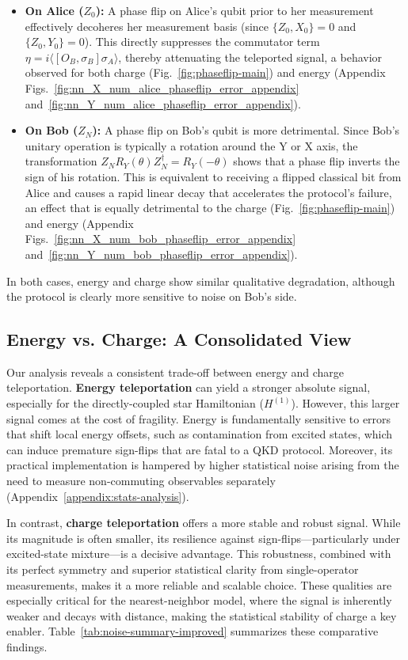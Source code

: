 \begin{itemize}
    \item \textbf{On Alice ($Z_0$):} A phase flip on Alice's qubit prior to her measurement effectively decoheres her measurement basis (since $\{Z_0, X_0\}=0$ and $\{Z_0, Y_0\}=0$). This directly suppresses the commutator term $\eta=i\langle[O_B, \sigma_B]\sigma_A\rangle$, thereby attenuating the teleported signal, a behavior observed for both charge (Fig.~\ref{fig:phaseflip-main}) and energy (Appendix Figs.~\ref{fig:nn_X_num_alice_phaseflip_error_appendix} and~\ref{fig:nn_Y_num_alice_phaseflip_error_appendix}).
    \item \textbf{On Bob ($Z_N$):} A phase flip on Bob's qubit is more detrimental. Since Bob's unitary operation is typically a rotation around the Y or X axis, the transformation $Z_N R_Y(\theta) Z_N^\dagger = R_Y(-\theta)$ shows that a phase flip inverts the sign of his rotation. This is equivalent to receiving a flipped classical bit from Alice and causes a rapid linear decay that accelerates the protocol's failure, an effect that is equally detrimental to the charge (Fig.~\ref{fig:phaseflip-main}) and energy (Appendix Figs.~\ref{fig:nn_X_num_bob_phaseflip_error_appendix} and~\ref{fig:nn_Y_num_bob_phaseflip_error_appendix}).
\end{itemize}

In both cases, energy and charge show similar qualitative degradation, although the protocol is clearly more sensitive to noise on Bob's side.

\subsection{Energy vs. Charge: A Consolidated View}
\label{subsec:consolidated}

Our analysis reveals a consistent trade-off between energy and charge teleportation. \textbf{Energy teleportation} can yield a stronger absolute signal, especially for the directly-coupled star Hamiltonian ($H^{(1)}$). However, this larger signal comes at the cost of fragility. Energy is fundamentally sensitive to errors that shift local energy offsets, such as contamination from excited states, which can induce premature sign-flips that are fatal to a QKD protocol. Moreover, its practical implementation is hampered by higher statistical noise arising from the need to measure non-commuting observables separately (Appendix~\ref{appendix:stats-analysis}).

In contrast, \textbf{charge teleportation} offers a more stable and robust signal. While its magnitude is often smaller, its resilience against sign-flips—particularly under excited-state mixture—is a decisive advantage. This robustness, combined with its perfect symmetry and superior statistical clarity from single-operator measurements, makes it a more reliable and scalable choice. These qualities are especially critical for the nearest-neighbor model, where the signal is inherently weaker and decays with distance, making the statistical stability of charge a key enabler. Table~\ref{tab:noise-summary-improved} summarizes these comparative findings.

